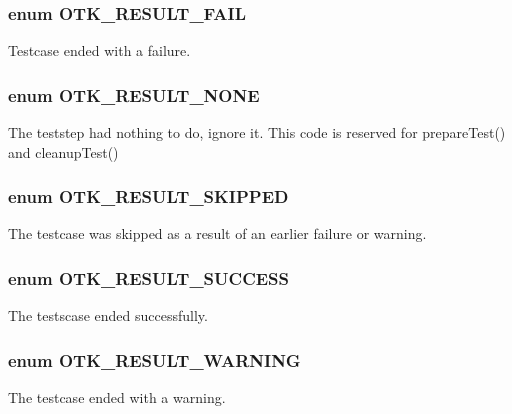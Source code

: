 \subsubsection[{OTK\_\-RESULT\_\-FAIL}]{\setlength{\rightskip}{0pt plus 5cm}enum {\bf OTK\_\-RESULT\_\-FAIL}}\label{group__Test__Results_gaeb82ae39d76794b6ba8ff719fb456f06}


Testcase ended with a failure. 

\subsubsection[{OTK\_\-RESULT\_\-NONE}]{\setlength{\rightskip}{0pt plus 5cm}enum {\bf OTK\_\-RESULT\_\-NONE}}\label{group__Test__Results_gac4a467b8c7025f04e4915877cf7626eb}


The teststep had nothing to do, ignore it. This code is reserved for prepareTest() and cleanupTest() 

\subsubsection[{OTK\_\-RESULT\_\-SKIPPED}]{\setlength{\rightskip}{0pt plus 5cm}enum {\bf OTK\_\-RESULT\_\-SKIPPED}}\label{group__Test__Results_gaff709930ec00f9e05e0b93fa421e214e}


The testcase was skipped as a result of an earlier failure or warning. 

\subsubsection[{OTK\_\-RESULT\_\-SUCCESS}]{\setlength{\rightskip}{0pt plus 5cm}enum {\bf OTK\_\-RESULT\_\-SUCCESS}}\label{group__Test__Results_ga3edb448eb67c540e4343ec5797555604}


The testscase ended successfully. 

\subsubsection[{OTK\_\-RESULT\_\-WARNING}]{\setlength{\rightskip}{0pt plus 5cm}enum {\bf OTK\_\-RESULT\_\-WARNING}}\label{group__Test__Results_ga90bcc995d175f83e3c5dc29597b35819}


The testcase ended with a warning. 


